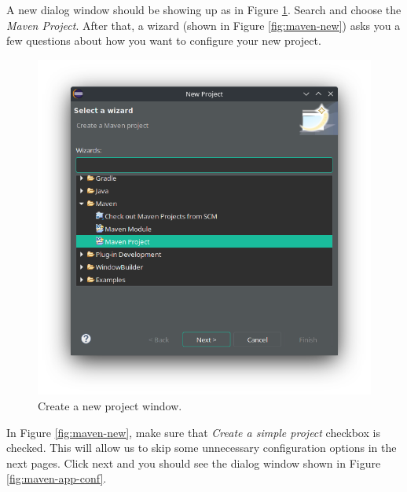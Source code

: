 A new dialog window should be showing up as in Figure \ref{fig:eclipse-project}. Search and choose the \emph{Maven Project}. After that, a wizard (shown in Figure \ref{fig:maven-new}) asks you a few questions about how you want to configure your new project.

\begin{figure}[H]
    \centering
    \includegraphics[width=\textwidth]{images/eclipse-project.png}
    \caption{Create a new project window.}
    \label{fig:eclipse-project}
\end{figure}

In Figure \ref{fig:maven-new}, make sure that \emph{Create a simple project} checkbox is checked. This will allow us to skip some unnecessary configuration options in the next pages. Click next and you should see the dialog window shown in Figure \ref{fig:maven-app-conf}.

